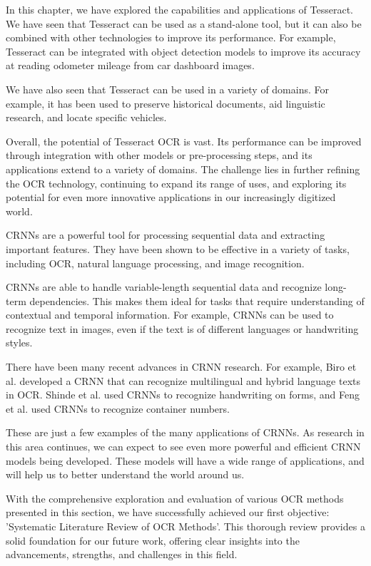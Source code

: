 In this chapter, we have explored the capabilities and applications of Tesseract. We have seen that Tesseract can be used as a stand-alone tool, but it can also be combined with other technologies to improve its performance. For example, Tesseract can be integrated with object detection models to improve its accuracy at reading odometer mileage from car dashboard images.

We have also seen that Tesseract can be used in a variety of domains. For example, it has been used to preserve historical documents, aid linguistic research, and locate specific vehicles.

Overall, the potential of Tesseract OCR is vast. Its performance can be improved through integration with other models or pre-processing steps, and its applications extend to a variety of domains. The challenge lies in further refining the OCR technology, continuing to expand its range of uses, and exploring its potential for even more innovative applications in our increasingly digitized world.

CRNNs are a powerful tool for processing sequential data and extracting important features. They have been shown to be effective in a variety of tasks, including OCR, natural language processing, and image recognition.

CRNNs are able to handle variable-length sequential data and recognize long-term dependencies. This makes them ideal for tasks that require understanding of contextual and temporal information. For example, CRNNs can be used to recognize text in images, even if the text is of different languages or handwriting styles.

There have been many recent advances in CRNN research. For example, Biro et al. developed a CRNN that can recognize multilingual and hybrid language texts in OCR. Shinde et al. used CRNNs to recognize handwriting on forms, and Feng et al. used CRNNs to recognize container numbers.

These are just a few examples of the many applications of CRNNs. As research in this area continues, we can expect to see even more powerful and efficient CRNN models being developed. These models will have a wide range of applications, and will help us to better understand the world around us.

With the comprehensive exploration and evaluation of various OCR methods presented in this section, we have successfully achieved our first objective: 'Systematic Literature Review of OCR Methods'. This thorough review provides a solid foundation for our future work, offering clear insights into the advancements, strengths, and challenges in this field.
